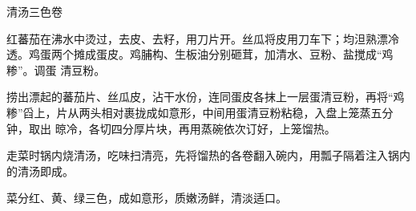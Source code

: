 \begin{recipe}[三色如意卷]{清汤三色卷}

\ingredients


\preparation

\step 红蕃茄在沸水中烫过，去皮、去籽，用刀片开。丝瓜将皮用刀车下；均泹熟漂冷
透。鸡蛋两个摊成蛋皮。鸡脯构、生板油分别砸茸，加清水、豆粉、盐搅成“鸡糁”。调蛋
清豆粉。

\step 捞出漂起的蕃茄片、丝瓜皮，沾干水份，连同蛋皮各抹上一层蛋清豆粉，再将“鸡
糁”舀上，片从两头相对裹拢成如意形，中间用蛋清豆粉粘稳，入盘上笼蒸五分钟，取出
晾冷，各切四分厚片块，再用蒸碗依次订好，上笼馏热。

\step 走菜时锅内烧清汤，吃味扫清亮，先将馏热的各卷翻入碗内，用瓢子隔着注入锅内
的清汤即成。

\features

菜分红、黄、绿三色，成如意形，质嫩汤鲜，清淡适口。

\end{recipe}

